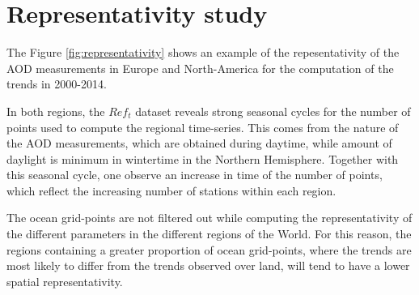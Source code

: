 \documentclass[journal abbreviation, manuscript]{copernicus}
\begin{document}






\appendix
\section{Representativity study} \label{sec:representativity} %

The Figure \ref{fig:representativity} shows an example of the repesentativity of the AOD measurements in Europe and North-America for the computation of the trends in 2000-2014.

In both regions, the $Ref_{t}$ dataset reveals strong seasonal cycles for the number of points used to compute the regional time-series. This comes from the nature of the AOD measurements, which are obtained during daytime, while amount of daylight is minimum in wintertime in the Northern Hemisphere. Together with this seasonal cycle, one observe an increase in time of the number of points, which reflect the increasing number of stations within each region.

The ocean grid-points are not filtered out while computing the representativity of the different parameters in the different regions of the World. For this reason, the regions containing a greater proportion of ocean grid-points, where the trends are most likely to differ from the trends observed over land, will tend to have a lower spatial representativity.

\subsection{}     %


\noappendix       %


\end{document}
